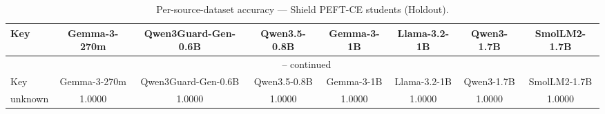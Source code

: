 \begin{landscape}
\begin{longtable}{lccccccc}
\caption{Per-source-dataset accuracy — Shield PEFT-CE students (Holdout).} \\
\label{tab:students_peft_ce_per_dataset_holdout}
\toprule
Key & Gemma-3-270m & Qwen3Guard-Gen-0.6B & Qwen3.5-0.8B & Gemma-3-1B & Llama-3.2-1B & Qwen3-1.7B & SmolLM2-1.7B \\
\midrule
\endfirsthead
\multicolumn{8}{c}{\tablename\ \thetable{} -- continued} \\
\toprule
Key & Gemma-3-270m & Qwen3Guard-Gen-0.6B & Qwen3.5-0.8B & Gemma-3-1B & Llama-3.2-1B & Qwen3-1.7B & SmolLM2-1.7B \\
\midrule
\endhead
unknown & 1.0000 & 1.0000 & 1.0000 & 1.0000 & 1.0000 & 1.0000 & 1.0000 \\
\bottomrule
\end{longtable}
\end{landscape}